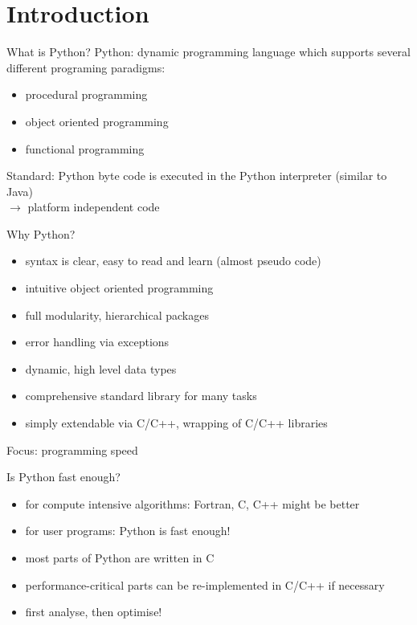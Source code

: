\section{Introduction}

\begin{frame}{What is Python?}
\alert{Python:} dynamic programming language which supports several different programing paradigms:
\begin{itemize}
\item procedural programming
\item object oriented programming
\item functional programming
\end{itemize}
Standard: Python byte code is executed in the Python interpreter (similar to Java)\\
$\rightarrow$ \alert{platform independent code}
\end{frame}

\begin{frame}{Why Python?}
\begin{itemize}
\item syntax is clear, easy to read and learn (almost pseudo code)
\item intuitive object oriented programming
\item full modularity, hierarchical packages
\item error handling via exceptions
\item dynamic, high level data types
\item comprehensive standard library for many tasks
\item simply extendable via C/C++, wrapping of C/C++ libraries
\end{itemize}
\alert{Focus: programming speed}
\end{frame}

\begin{frame}{Is Python fast enough?}
\begin{itemize}
\item for compute intensive algorithms: Fortran, C, C++ might be better
\item for user programs: Python is fast enough!
\item most parts of Python are written in C
\item performance-critical parts can be re-implemented in C/C++ if necessary
\item first analyse, then optimise!
\end{itemize}
\end{frame}

